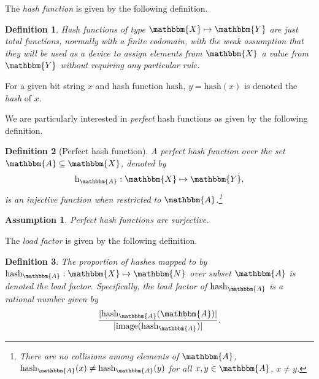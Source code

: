 \documentclass[hidelinks,11pt,final]{article}
\newcommand{\envnumstyle}{section}
\theoremstyle{plain}
\newtheorem{definition}{Definition}[\envnumstyle]
\newtheorem{assumption}{Assumption}
\begin{document}


The \emph{hash function} is given by the following definition.
\begin{definition}
\emph{Hash functions} of type $\mathbbm{X} \mapsto \mathbbm{Y}$ are just total functions, normally with a finite codomain, with the weak assumption that they will be used as a device to assign elements from $\mathbbm{X}$ a value from $\mathbbm{Y}$ without requiring any particular rule.
\end{definition}
For a given bit string $x$ and hash function $\mathrm{hash}$, $y = \mathrm{hash}(x)$ is denoted the \emph{hash} of $x$.

We are particularly interested in \emph{perfect} hash functions as given by the following definition.
\begin{definition}[Perfect hash function]
A \emph{perfect hash function} over the set $\mathbbm{A} \subseteq \mathbbm{X}$, denoted by
\begin{equation}
    \mathrm{h}_\mathbbm{A} : \mathbbm{X} \mapsto \mathbbm{Y},
\end{equation}
is an injective function when restricted to $\mathbbm{A}$.\footnote{There are no collisions among elements of $\mathbbm{A}$, $\mathrm{hash}_\mathbbm{A}(x) \neq \mathrm{hash}_\mathbbm{A}(y)$ for all $x, y \in \mathbbm{A}$, $x \neq y$.}
\end{definition}

\begin{assumption}
Perfect hash functions are \emph{surjective}.
\end{assumption}

The \emph{load factor} is given by the following definition.
\begin{definition}
\label{def:loadfactor}
The proportion of hashes mapped to by $\mathrm{hash}_{\mathbbm{A}} : \mathbbm{X} \mapsto \mathbbm{N}$ over subset $\mathbbm{A}$ is denoted the load factor.
Specifically, the load factor of $\mathrm{hash}_{\mathbbm{A}}$ is a rational number given by
\begin{equation}
\label{eq:loadfactor}
    \frac{|\mathrm{hash}_{\mathbbm{A}}(\mathbbm{A})|}{|\mathrm{image}(\mathrm{hash}_{\mathbbm{A}})|}.
\end{equation}
\end{definition}
\end{document}
